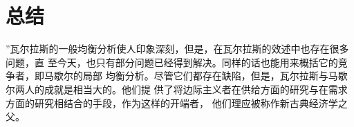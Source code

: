 \section{总结}

”瓦尔拉斯的一般均衡分析使人印象深刻，但是，在瓦尔拉斯的效述中也存在很多问题，直
至今天，也只有部分问题已经得到解决。同样的话也能用来概括它的竞争者，即马歇尔的局部
均衡分析。尽管它们都存在缺陷，但是，瓦尔拉斯与马歇尔两人的成就是相当大的。他们提
供了将边际主义者在供给方面的研究与在需求方面的研究相结合的手段，作为这样的开端者，
他们理应被称作新古典经济学之父。


